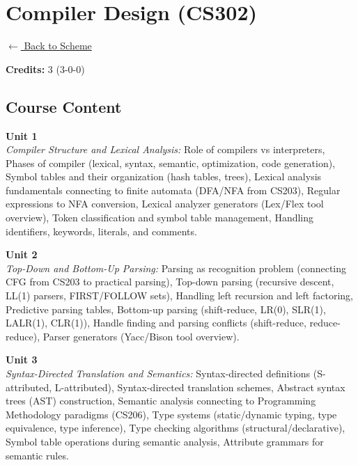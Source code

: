 \section*{Compiler Design (CS302)}
\label{course:CS302}

\noindent \small{\hyperref[main:scheme]{$\leftarrow$ Back to Scheme}} \vspace{0.5cm}

\noindent \textbf{Credits:} 3 (3-0-0)

\subsection*{Course Content}
\noindent\textbf{Unit 1} \\
\textit{Compiler Structure and Lexical Analysis:} Role of compilers vs interpreters, Phases of compiler (lexical, syntax, semantic, optimization, code generation), Symbol tables and their organization (hash tables, trees), Lexical analysis fundamentals connecting to finite automata (DFA/NFA from CS203), Regular expressions to NFA conversion, Lexical analyzer generators (Lex/Flex tool overview), Token classification and symbol table management, Handling identifiers, keywords, literals, and comments.

\vspace{0.3cm}

\noindent\textbf{Unit 2} \\
\textit{Top-Down and Bottom-Up Parsing:} Parsing as recognition problem (connecting CFG from CS203 to practical parsing), Top-down parsing (recursive descent, LL(1) parsers, FIRST/FOLLOW sets), Handling left recursion and left factoring, Predictive parsing tables, Bottom-up parsing (shift-reduce, LR(0), SLR(1), LALR(1), CLR(1)), Handle finding and parsing conflicts (shift-reduce, reduce-reduce), Parser generators (Yacc/Bison tool overview).

\vspace{0.3cm}

\noindent\textbf{Unit 3} \\
\textit{Syntax-Directed Translation and Semantics:} Syntax-directed definitions (S-attributed, L-attributed), Syntax-directed translation schemes, Abstract syntax trees (AST) construction, Semantic analysis connecting to Programming Methodology paradigms (CS206), Type systems (static/dynamic typing, type equivalence, type inference), Type checking algorithms (structural/declarative), Symbol table operations during semantic analysis, Attribute grammars for semantic rules.

